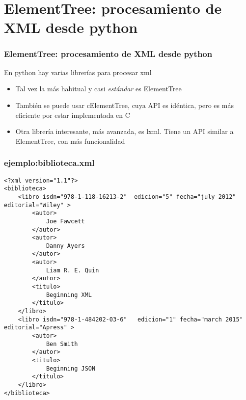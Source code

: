 \documentclass[ucs]{beamer}
\begin{document}
\section{ElementTree: procesamiento de XML desde python}
\begin{frame}[fragile]
\frametitle{ElementTree: procesamiento de XML desde python}
En python hay varias librerías para procesar xml
\begin{itemize}
\item
Tal vez la más habitual y casi \emph{estándar} es ElementTree
\item
También se puede usar cElementTree, cuya API es idéntica, pero es más
eficiente por estar implementada en C
\item
Otra librería interesante, más avanzada, es lxml. Tiene un API similar a
ElementTree, con más funcionalidad
\end{itemize}

\end{frame}


\begin{frame}[fragile]
\frametitle{ejemplo:biblioteca.xml}

  \begin{tiny}
  \begin{verbatim}
<?xml version="1.1"?>
<biblioteca>
    <libro isdn="978-1-118-16213-2"  edicion="5" fecha="july 2012" editorial="Wiley" >
        <autor>
            Joe Fawcett
        </autor>
        <autor>
            Danny Ayers
        </autor>
        <autor>
            Liam R. E. Quin
        </autor>
        <titulo>
            Beginning XML
        </titulo>
    </libro>
    <libro isdn="978-1-484202-03-6"   edicion="1" fecha="march 2015" editorial="Apress" >
        <autor>
            Ben Smith
        </autor>
        <titulo>
            Beginning JSON
        </titulo>
    </libro>
</biblioteca>
  \end{verbatim}
  \end{tiny}
\end{frame}
\end{document}
